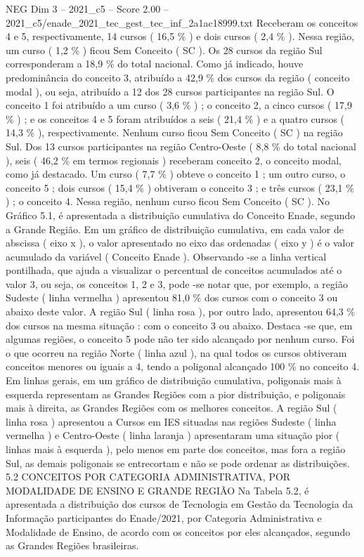 \begin{textsample}{NEG Dim 3 – 2021\_c5 – Score 2.00 – 2021\_c5/enade\_2021\_tec\_gest\_tec\_inf\_2a1ac18999.txt}
Receberam os conceitos 4 e 5, respectivamente, 14 cursos ( 16,5 \% ) e dois cursos ( 2,4 \% ).
Nessa região, um curso ( 1,2 \% ) ficou Sem Conceito ( SC ).
Os 28 cursos da região Sul corresponderam a 18,9 \% do total nacional.
Como já indicado, houve predominância do conceito 3, atribuído a 42,9 \% dos cursos da região ( conceito modal ), ou seja, atribuído a 12 dos 28 cursos participantes na região Sul.
O conceito 1 foi atribuído a um curso ( 3,6 \% ) ; o conceito 2, a cinco cursos ( 17,9 \% ) ; e os conceitos 4 e 5 foram atribuídos a seis ( 21,4 \% ) e a quatro cursos ( 14,3 \% ), respectivamente.
Nenhum curso ficou Sem Conceito ( SC ) na região Sul.
Dos 13 cursos participantes na região Centro-Oeste ( 8,8 \% do total nacional ), seis ( 46,2 \% em termos regionais ) receberam conceito 2, o conceito modal, como já destacado.
Um curso ( 7,7 \% ) obteve o conceito 1 ; um outro curso, o conceito 5 ; dois cursos ( 15,4 \% ) obtiveram o conceito 3 ; e três cursos ( 23,1 \% ) ; o conceito 4.
Nessa região, nenhum curso ficou Sem Conceito ( SC ).
No Gráfico 5.1, é apresentada a distribuição cumulativa do Conceito Enade, segundo a Grande Região.
Em um gráfico de distribuição cumulativa, em cada valor de abscissa ( eixo x ), o valor apresentado no eixo das ordenadas ( eixo y ) é o valor acumulado da variável ( Conceito Enade ).
Observando -se a linha vertical pontilhada, que ajuda a visualizar o percentual de conceitos acumulados até o valor 3, ou seja, os conceitos 1, 2 e 3, pode -se notar que, por exemplo, a região Sudeste ( linha vermelha ) apresentou 81,0 \% dos cursos com o conceito 3 ou abaixo deste valor.
A região Sul ( linha rosa ), por outro lado, apresentou 64,3 \% dos cursos na mesma situação : com o conceito 3 ou abaixo.
Destaca -se que, em algumas regiões, o conceito 5 pode não ter sido alcançado por nenhum curso.
Foi o que ocorreu na região Norte ( linha azul ), na qual todos os cursos obtiveram conceitos menores ou iguais a 4, tendo a poligonal alcançado 100 \% no conceito 4.
Em linhas gerais, em um gráfico de distribuição cumulativa, poligonais mais à esquerda representam as Grandes Regiões com a pior distribuição, e poligonais mais à direita, as Grandes Regiões com os melhores conceitos.
A região Sul ( linha rosa ) apresentou a Cursos em IES situadas nas regiões Sudeste ( linha vermelha ) e Centro-Oeste ( linha laranja ) apresentaram uma situação pior ( linhas mais à esquerda ), pelo menos em parte dos conceitos, mas fora a região Sul, as demais poligonais se entrecortam e não se pode ordenar as distribuições. 5.2 CONCEITOS POR CATEGORIA ADMINISTRATIVA, POR MODALIDADE DE ENSINO E GRANDE REGIÃO Na Tabela 5.2, é apresentada a distribuição dos cursos de Tecnologia em Gestão da Tecnologia da Informação participantes do Enade/2021, por Categoria Administrativa e Modalidade de Ensino, de acordo com os conceitos por eles alcançados, segundo as Grandes Regiões brasileiras.

\end{textsample}
